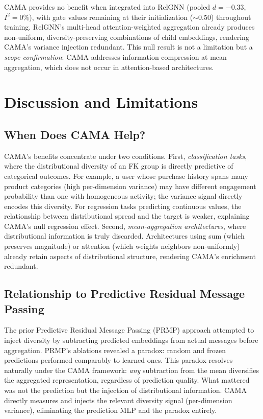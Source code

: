 \documentclass[11pt,letterpaper]{article}
\begin{document}
CAMA provides no benefit when integrated into RelGNN (pooled $d = -0.33$, $I^2 = 0\%$), with gate values remaining at their initialization (${\sim}0.50$) throughout training. RelGNN's multi-head attention-weighted aggregation already produces non-uniform, diversity-preserving combinations of child embeddings, rendering CAMA's variance injection redundant. This null result is not a limitation but a \emph{scope confirmation}: CAMA addresses information compression at mean aggregation, which does not occur in attention-based architectures.


\section{Discussion and Limitations}
\label{sec:discussion}

\subsection{When Does CAMA Help?}
\label{sec:when}

CAMA's benefits concentrate under two conditions. First, \emph{classification tasks}, where the distributional diversity of an FK group is directly predictive of categorical outcomes. For example, a user whose purchase history spans many product categories (high per-dimension variance) may have different engagement probability than one with homogeneous activity; the variance signal directly encodes this diversity. For regression tasks predicting continuous values, the relationship between distributional spread and the target is weaker, explaining CAMA's null regression effect. Second, \emph{mean-aggregation architectures}, where distributional information is truly discarded. Architectures using sum (which preserves magnitude) or attention (which weights neighbors non-uniformly) already retain aspects of distributional structure, rendering CAMA's enrichment redundant.

\subsection{Relationship to Predictive Residual Message Passing}
\label{sec:prmp}

The prior Predictive Residual Message Passing (PRMP) approach attempted to inject diversity by subtracting predicted embeddings from actual messages before aggregation. PRMP's ablations revealed a paradox: random and frozen predictions performed comparably to learned ones. This paradox resolves naturally under the CAMA framework: \emph{any} subtraction from the mean diversifies the aggregated representation, regardless of prediction quality. What mattered was not the prediction but the injection of distributional information. CAMA directly measures and injects the relevant diversity signal (per-dimension variance), eliminating the prediction MLP and the paradox entirely.
\end{document}
